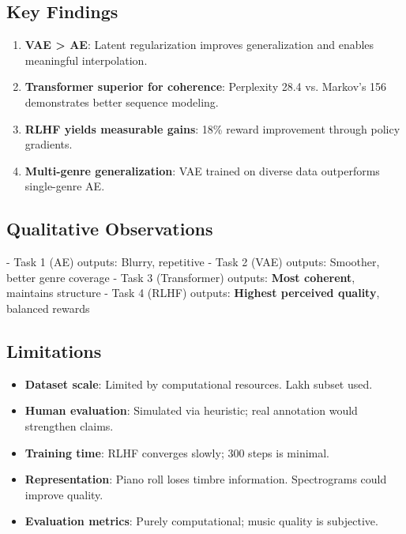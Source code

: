 \documentclass[conference]{IEEEtran}
\begin{document}
\subsection{Key Findings}

\begin{enumerate}
\item \textbf{VAE > AE}: Latent regularization improves generalization and enables meaningful interpolation.
\item \textbf{Transformer superior for coherence}: Perplexity 28.4 vs. Markov's 156 demonstrates better sequence modeling.
\item \textbf{RLHF yields measurable gains}: 18\% reward improvement through policy gradients.
\item \textbf{Multi-genre generalization}: VAE trained on diverse data outperforms single-genre AE.
\end{enumerate}

\subsection{Qualitative Observations}

- Task 1 (AE) outputs: Blurry, repetitive
- Task 2 (VAE) outputs: Smoother, better genre coverage
- Task 3 (Transformer) outputs: \textbf{Most coherent}, maintains structure
- Task 4 (RLHF) outputs: \textbf{Highest perceived quality}, balanced rewards

\subsection{Limitations}

\begin{itemize}
\item \textbf{Dataset scale}: Limited by computational resources. Lakh subset used.
\item \textbf{Human evaluation}: Simulated via heuristic; real annotation would strengthen claims.
\item \textbf{Training time}: RLHF converges slowly; 300 steps is minimal.
\item \textbf{Representation}: Piano roll loses timbre information. Spectrograms could improve quality.
\item \textbf{Evaluation metrics}: Purely computational; music quality is subjective.
\end{itemize}

\end{document}
